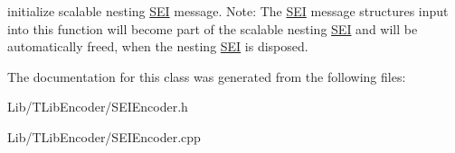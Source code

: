 initialize scalable nesting \hyperlink{class_s_e_i}{S\+EI} message. Note\+: The \hyperlink{class_s_e_i}{S\+EI} message structures input into this function will become part of the scalable nesting \hyperlink{class_s_e_i}{S\+EI} and will be automatically freed, when the nesting \hyperlink{class_s_e_i}{S\+EI} is disposed. 

The documentation for this class was generated from the following files\+:\begin{DoxyCompactItemize}
\item 
Lib/\+T\+Lib\+Encoder/S\+E\+I\+Encoder.\+h\item 
Lib/\+T\+Lib\+Encoder/S\+E\+I\+Encoder.\+cpp\end{DoxyCompactItemize}
